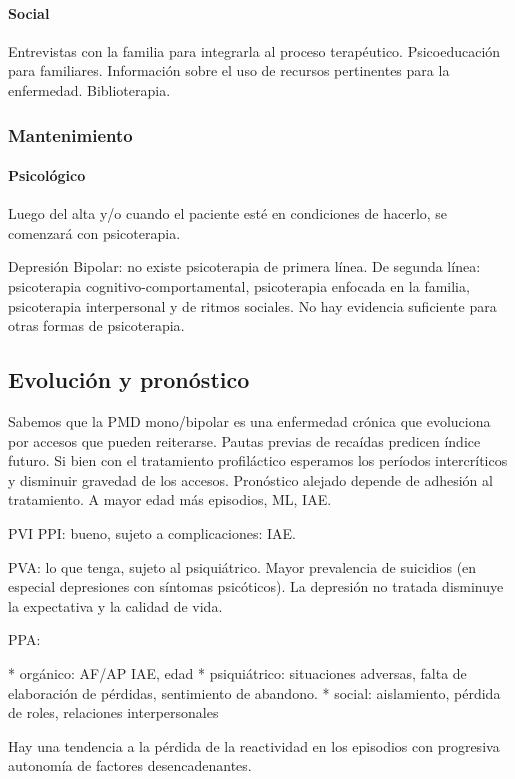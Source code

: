\paragraph{Social}

Entrevistas con la familia para integrarla al proceso terapéutico. Psicoeducación para familiares. Información sobre el uso de recursos pertinentes para la enfermedad. Biblioterapia.
\subsubsection*{Mantenimiento}
\paragraph{Psicológico}
Luego del alta y/o cuando el paciente esté en condiciones de hacerlo, se comenzará con psicoterapia.

Depresión Bipolar: no existe psicoterapia de primera línea. De segunda línea: psicoterapia cognitivo-comportamental, psicoterapia enfocada en la familia, psicoterapia interpersonal y de ritmos sociales. No hay evidencia suficiente para otras formas de psicoterapia\cite{yatham2018canadian}.
\subsection*{Evolución y pronóstico}

Sabemos que la PMD mono/bipolar es una enfermedad crónica que evoluciona por accesos que pueden reiterarse. Pautas previas de recaídas predicen índice futuro. Si bien con el tratamiento profiláctico esperamos los períodos intercríticos y disminuir gravedad de los accesos. Pronóstico alejado depende de adhesión al tratamiento. A mayor edad más episodios, ML, IAE.

PVI PPI: bueno, sujeto a complicaciones: IAE.

PVA: lo que tenga, sujeto al psiquiátrico. Mayor prevalencia de suicidios (en especial depresiones con síntomas psicóticos). La depresión no tratada disminuye la expectativa y la calidad de vida.

PPA:

* orgánico: AF/AP IAE, edad
* psiquiátrico: situaciones adversas, falta de elaboración de pérdidas, sentimiento de abandono.
* social: aislamiento, pérdida de roles, relaciones interpersonales

Hay una tendencia a la pérdida de la reactividad en los episodios con progresiva autonomía de factores desencadenantes.

